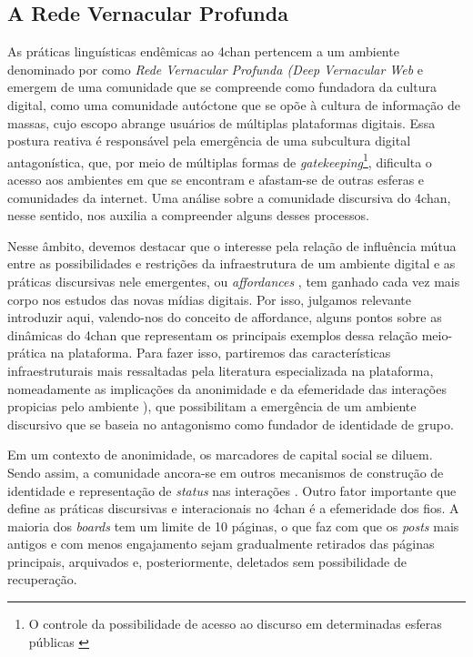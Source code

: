 \documentclass[portuguese]{textolivre}
\begin{document}
\subsection{A Rede Vernacular Profunda}

As práticas linguísticas endêmicas ao 4chan pertencem a um ambiente denominado por \textcite{tuters2018larping} como \emph{Rede Vernacular Profunda (Deep Vernacular Web} e emergem de uma comunidade que se compreende como fundadora da cultura digital, como uma comunidade autóctone que se opõe à cultura de informação de massas, cujo escopo abrange usuários de múltiplas plataformas digitais. Essa postura reativa é responsável pela emergência de uma subcultura digital antagonística, que, por meio de múltiplas formas de \emph{gatekeeping}\footnote{O controle da possibilidade de acesso ao discurso em determinadas esferas públicas \cite[p. 25]{wodakreisigl2016}}, dificulta o acesso aos ambientes em que se encontram e afastam-se de outras esferas e comunidades da internet. Uma análise sobre a comunidade discursiva do 4chan, nesse sentido, nos auxilia a compreender alguns desses processos. 

Nesse âmbito, devemos destacar que o interesse pela relação de influência mútua entre as possibilidades e restrições da infraestrutura de um ambiente digital e as práticas discursivas nele emergentes, ou \emph{affordances} \cite{tuters2021meme}, tem ganhado cada vez mais corpo nos estudos das novas mídias digitais. Por isso, julgamos relevante introduzir aqui, valendo-nos do conceito de affordance, alguns pontos sobre as dinâmicas do 4chan que representam os principais exemplos dessa relação meio-prática na plataforma. Para fazer isso, partiremos das características infraestruturais mais ressaltadas pela literatura especializada na plataforma, nomeadamente as implicações da anonimidade e da efemeridade das interações propicias pelo ambiente \cite{bernstein20114chan, saklofske2011using, hine2017kek}), que possibilitam a emergência de um ambiente discursivo que se baseia no antagonismo como fundador de identidade de grupo. 

Em um contexto de anonimidade, os marcadores de capital social se diluem. Sendo assim, a comunidade ancora-se em outros mecanismos de construção de identidade e representação de \emph{status} nas interações \cite{tuters2018larping, tuters2021meme, colley2022challenges}. Outro fator importante que define as práticas discursivas e interacionais no 4chan é a efemeridade dos fios. A maioria dos \emph{boards} tem um limite de 10 páginas, o que faz com que os \emph{posts} mais antigos e com menos engajamento sejam gradualmente retirados das páginas principais, arquivados e, posteriormente, deletados sem possibilidade de recuperação.
\end{document}
